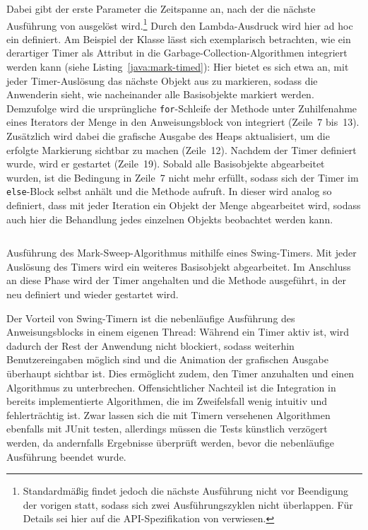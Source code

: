 \vspace*{-0.5cm}
Dabei gibt der erste Parameter  die Zeitspanne an, nach der die nächste Ausführung von  ausgelöst wird.\footnote{Standardmäßig findet jedoch die nächste Ausführung nicht vor Beendigung der vorigen statt, sodass sich zwei Ausführungszyklen nicht überlappen. Für Details sei hier auf die API-Spezifikation von  verwiesen.}
Durch den Lambda-Ausdruck  wird hier ad hoc ein  definiert.
Am Beispiel der Klasse  lässt sich exemplarisch betrachten, wie ein derartiger Timer als Attribut in die Garbage-Collection-Algorithmen integriert werden kann (siehe Listing~\ref{java:mark-timed}):
Hier bietet es sich etwa an, mit jeder Timer-Auslösung das nächste Objekt aus  zu markieren, sodass die Anwenderin sieht, wie nacheinander alle Basisobjekte markiert werden.
Demzufolge wird die ursprüngliche \texttt{for}-Schleife der Methode  unter Zuhilfenahme eines Iterators der Menge  in den Anweisungsblock von  integriert (Zeile~7 bis~13).
Zusätzlich wird dabei die grafische Ausgabe des Heaps aktualisiert, um die erfolgte Markierung sichtbar zu machen (Zeile~12).
Nachdem der Timer definiert wurde, wird er gestartet (Zeile~19).
Sobald alle Basisobjekte abgearbeitet wurden, ist die Bedingung in Zeile~7 nicht mehr erfüllt, sodass sich der Timer im \texttt{else}-Block selbst anhält und die Methode  aufruft.
In dieser wird  analog so definiert, dass mit jeder Iteration ein Objekt der Menge  abgearbeitet wird, sodass auch hier die Behandlung jedes einzelnen Objekts beobachtet werden kann.

\begin{listing}[h]
	\inputminted[lastline=20]{java}{code/MarkSweep-timed.java}
	\caption[Ausführung des Mark-Sweep-Algorithmus mithilfe eines Swing-Timers]{Ausführung des Mark-Sweep-Algorithmus mithilfe eines Swing-Timers. Mit jeder Auslösung des Timers wird ein weiteres Basisobjekt abgearbeitet. Im Anschluss an diese Phase wird der Timer angehalten und die Methode  ausgeführt, in der  neu definiert und wieder gestartet wird.}
	\label{java:mark-timed}
\end{listing}

Der Vorteil von Swing-Timern ist die nebenläufige Ausführung des Anweisungsblocks in einem eigenen Thread:
Während ein Timer aktiv ist, wird dadurch der Rest der Anwendung nicht blockiert, sodass weiterhin Benutzereingaben möglich sind und die Animation der grafischen Ausgabe überhaupt sichtbar ist.
Dies ermöglicht zudem, den Timer anzuhalten und einen Algorithmus zu unterbrechen.
Offensichtlicher Nachteil ist die Integration in bereits implementierte Algorithmen, die im Zweifelsfall wenig intuitiv und fehlerträchtig ist.
Zwar lassen sich die mit Timern versehenen Algorithmen ebenfalls mit JUnit testen, allerdings müssen die Tests künstlich verzögert werden, da andernfalls Ergebnisse überprüft werden, bevor die nebenläufige Ausführung beendet wurde.